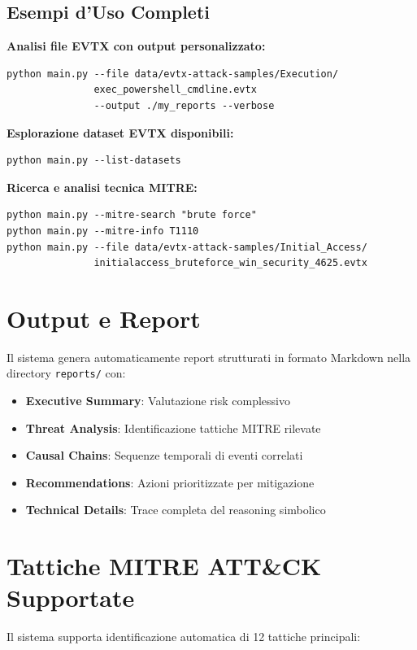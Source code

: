 \documentclass[12pt,a4paper]{report}
\theoremstyle{definition}
\begin{document}
\subsection{Esempi d'Uso Completi}

\textbf{Analisi file EVTX con output personalizzato:}
\begin{verbatim}
python main.py --file data/evtx-attack-samples/Execution/
               exec_powershell_cmdline.evtx 
               --output ./my_reports --verbose
\end{verbatim}

\textbf{Esplorazione dataset EVTX disponibili:}
\begin{verbatim}
python main.py --list-datasets
\end{verbatim}

\textbf{Ricerca e analisi tecnica MITRE:}
\begin{verbatim}
python main.py --mitre-search "brute force"
python main.py --mitre-info T1110
python main.py --file data/evtx-attack-samples/Initial_Access/
               initialaccess_bruteforce_win_security_4625.evtx
\end{verbatim}

\section{Output e Report}

Il sistema genera automaticamente report strutturati in formato Markdown nella directory \texttt{reports/} con:

\begin{itemize}
\item \textbf{Executive Summary}: Valutazione risk complessivo
\item \textbf{Threat Analysis}: Identificazione tattiche MITRE rilevate
\item \textbf{Causal Chains}: Sequenze temporali di eventi correlati
\item \textbf{Recommendations}: Azioni prioritizzate per mitigazione
\item \textbf{Technical Details}: Trace completa del reasoning simbolico
\end{itemize}

\section{Tattiche MITRE ATT\&CK Supportate}

Il sistema supporta identificazione automatica di 12 tattiche principali:
\end{document}
